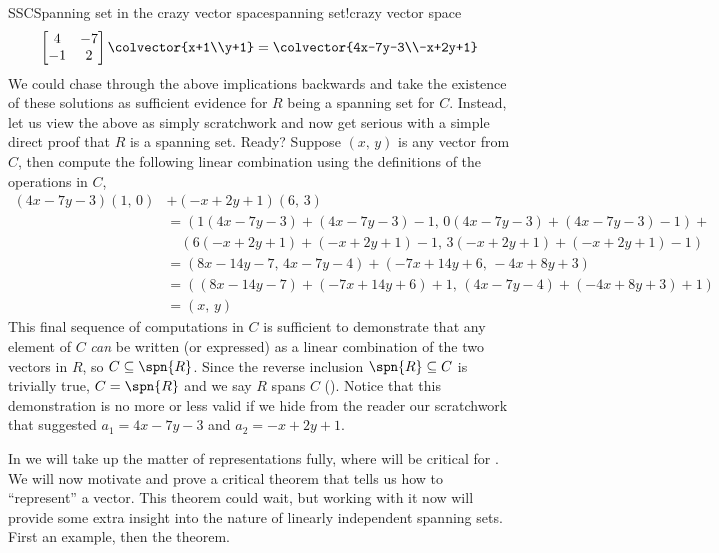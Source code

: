 \begin{example}{SSC}{Spanning set in the crazy vector space}{spanning set!crazy vector space}
\begin{equation*}
\begin{bmatrix} 4 & -7 \\ -1 & 2 \end{bmatrix}\colvector{x+1\\y+1}=
\colvector{4x-7y-3\\-x+2y+1}
\end{equation*}
%
We could chase through the above implications backwards and take the existence of these solutions as sufficient evidence for $R$ being a spanning set for $C$.  Instead, let us view the above as simply scratchwork and now get serious with a simple direct proof that $R$ is a spanning set.  Ready?  Suppose $(x,\,y)$ is any vector from $C$, then compute the following linear combination using the definitions of the operations in $C$,
%
\begin{align*}
(4x-7y-3)(1,\,0)&+(-x+2y+1)(6,\,3)\\
%
&=\left(1(4x-7y-3)+(4x-7y-3)-1,\,0(4x-7y-3)+(4x-7y-3)-1\right)+\\
&\quad\left(6(-x+2y+1)+(-x+2y+1)-1,\,3(-x+2y+1)+(-x+2y+1)-1\right)\\
%
&=(8x-14y-7,\,4x-7y-4)+(-7x+14y+6,\,-4x+8y+3)\\
%
&=((8x-14y-7)+(-7x+14y+6)+1,\,(4x-7y-4)+(-4x+8y+3)+1)\\
%
&=(x,\,y)
%
\end{align*}
%
This final sequence of computations in $C$ is sufficient to demonstrate that any element of $C$ {\em can} be written (or expressed) as a linear combination of the two vectors in $R$, so $C\subseteq\spn{R}$.  Since the reverse inclusion $\spn{R}\subseteq C$ is trivially true, $C=\spn{R}$ and we say $R$ spans $C$ ().  Notice that this demonstration is no more or less valid if we hide from the reader our scratchwork that suggested $a_1=4x-7y-3$ and $a_2=-x+2y+1$.
%
\end{example}
%
%
In  we will take up the matter of representations fully, where  will be critical for .  We will now motivate and prove a critical theorem that tells us how to ``represent'' a vector.   This theorem could wait, but working with it now will provide some extra insight into the nature of linearly independent spanning sets.  First an example, then the theorem.
%
%
